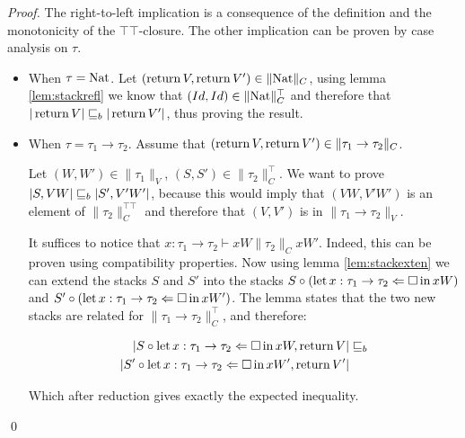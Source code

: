 \begin{ensps}
\begin{proof}
    The right-to-left implication is a consequence of the definition 
    and the monotonicity of the $\top\top$-closure.
    The other implication can be proven by case analysis on $\tau$.

    \begin{itemize}
        \item When $\tau = \textnormal{Nat}$. Let $(\operatorname{return} V, \operatorname{return} V') \in \| \textnormal{Nat} \|_C$,
            using lemma \ref{lem:stackrefl} we know that $(Id,Id) \in \| \textnormal{Nat}
            \|_C^\top$ and therefore that $|\operatorname{return} V| \sqsubseteq_b |\operatorname{return} V'|$, thus 
            proving the result.
        
        \item When $\tau = \tau_1 \to \tau_2$.
            Assume that $(\operatorname{return} V, \operatorname{return} V') \in 
            \| \tau_1 \to \tau_2 \|_C$.

            Let $(W,W') \in \| \tau_1 \|_V$, $(S,S') \in \| \tau_2 \|_C^\top$.
            We want to prove $|S, VW| \sqsubseteq_b |S',V'W'|$, because this would
            imply that $(VW,V'W')$ is an element of $\| \tau_2 \|_C^{\top\top}$
            and therefore that 
            $(V,V')$ is in $\| \tau_1 \to \tau_2 \|_V$.

            It suffices to notice that $x: \tau_1 \to \tau_2 \vdash xW \| \tau_2
            \|_C x W'$. Indeed, this can be proven using compatibility
            properties. Now using lemma \ref{lem:stackexten} we can extend the
            stacks $S$ and $S'$ into the stacks $S \circ
            (\operatorname{let} x:\tau_1 \to \tau_2 \Leftarrow \square \operatorname{in} xW)$ and $S' \circ
            (\operatorname{let} x:\tau_1 \to \tau_2 \Leftarrow \square \operatorname{in} xW')$. The lemma 
            states that the two new stacks are related for $\| \tau_1 \to \tau_2
            \|_C^\top$, and therefore:

            \begin{align*}
                |S \circ \operatorname{let} x:\tau_1 \to \tau_2 \Leftarrow \square \operatorname{in} xW, \operatorname{return} V| &\sqsubseteq_b \\
                |S' \circ \operatorname{let} x:\tau_1 \to \tau_2 \Leftarrow \square \operatorname{in} xW', \operatorname{return} V'| 
            \end{align*}

            Which after reduction gives exactly the expected inequality.

    \end{itemize}
\qed\end{proof}
\end{ensps}


